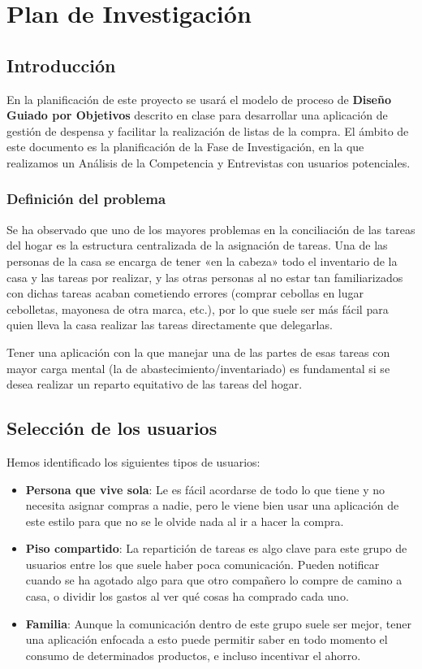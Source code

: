 \chapter{Plan de Investigación}

\section{Introducción}
En la planificación de este proyecto se usará el modelo de proceso de \textbf{Diseño Guiado por Objetivos} descrito en clase para desarrollar una aplicación de gestión de despensa y facilitar la realización de listas de la compra. El ámbito de este documento es la planificación de la Fase de Investigación, en la que realizamos un Análisis de la Competencia y Entrevistas con usuarios potenciales.

\subsection{Definición del problema}
Se ha observado que uno de los mayores problemas en la conciliación de las tareas del hogar es la estructura centralizada de la asignación de tareas. Una de las personas de la casa se encarga de tener «en la cabeza» todo el inventario de la casa y las tareas por realizar, y las otras personas al no estar tan familiarizados con dichas tareas acaban cometiendo errores (comprar cebollas en lugar cebolletas, mayonesa de otra marca, etc.), por lo que suele ser más fácil para quien lleva la casa realizar las tareas directamente que delegarlas.

Tener una aplicación con la que manejar una de las partes de esas tareas con mayor carga mental (la de abastecimiento/inventariado) es fundamental si se desea realizar un reparto equitativo de las tareas del hogar.

\section{Selección de los usuarios}
Hemos identificado los siguientes tipos de usuarios:
\begin{itemize}
    \item \textbf{Persona que vive sola}: Le es fácil acordarse de todo lo que tiene y no necesita asignar compras a nadie, pero le viene bien usar una aplicación de este estilo para que no se le olvide nada al ir a hacer la compra.
    \item \textbf{Piso compartido}: La repartición de tareas es algo clave para este grupo de usuarios entre los que suele haber poca comunicación. Pueden notificar cuando se ha agotado algo para que otro compañero lo compre de camino a casa, o dividir los gastos al ver qué cosas ha comprado cada uno.
    \item \textbf{Familia}: Aunque la comunicación dentro de este grupo suele ser mejor, tener una aplicación enfocada a esto puede permitir saber en todo momento el consumo de determinados productos, e incluso incentivar el ahorro.
\end{itemize}

